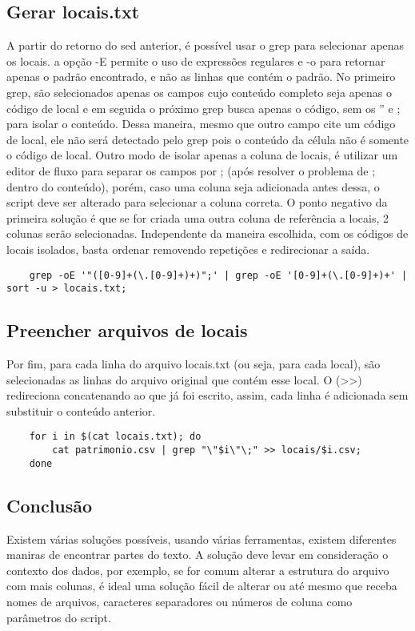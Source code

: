 \documentclass[oneside, 11 pt]{article}
\begin{document}
	\subsection{Gerar locais.txt}
	A partir do retorno do sed anterior, é possível usar o grep para selecionar apenas os locais. a opção -E permite o uso de expressões regulares e -o para retornar apenas o padrão encontrado, e não as linhas que contém o padrão. No primeiro grep, são selecionados apenas os campos cujo conteúdo completo seja apenas o código de local e em seguida o próximo grep busca apenas o código, sem os '' e ; para isolar o conteúdo. Dessa maneira, mesmo que outro campo cite um código de local, ele não será detectado pelo grep pois o conteúdo da célula não é somente o código de local. Outro modo de isolar apenas a coluna de locais, é utilizar um editor de fluxo para separar os campos por ; (após resolver o problema de ; dentro do conteúdo), porém, caso uma coluna seja adicionada antes dessa, o script deve ser alterado para selecionar a coluna correta. O ponto negativo da primeira solução é que se for criada uma outra coluna de referência a locais, 2 colunas serão selecionadas.
	Independente da maneira escolhida, com os códigos de locais isolados, basta ordenar removendo repetições e redirecionar a saída.
	\begin{lstlisting}
	grep -oE '"([0-9]+(\.[0-9]+)+)";' | grep -oE '[0-9]+(\.[0-9]+)+' | sort -u > locais.txt;
	\end{lstlisting}
	
	\subsection{Preencher arquivos de locais}
	Por fim, para cada linha do arquivo locais.txt (ou seja, para cada local), são selecionadas as linhas do arquivo original que contém esse local. O (>>) redireciona concatenando ao que já foi escrito, assim, cada linha é adicionada sem substituir o conteúdo anterior.
	\begin{lstlisting}
	for i in $(cat locais.txt); do
		cat patrimonio.csv | grep "\"$i\"\;" >> locais/$i.csv;
	done
	\end{lstlisting}
	
	\subsection{Conclusão}
	Existem várias soluções possíveis, usando várias ferramentas, existem diferentes maniras de encontrar partes do texto. A solução deve levar em consideração o contexto dos dados, por exemplo, se for comum alterar a estrutura do arquivo com mais colunas, é ideal uma solução fácil de alterar ou até mesmo que receba nomes de arquivos, caracteres separadores ou números de coluna como parâmetros do script.
	



\end{document}
